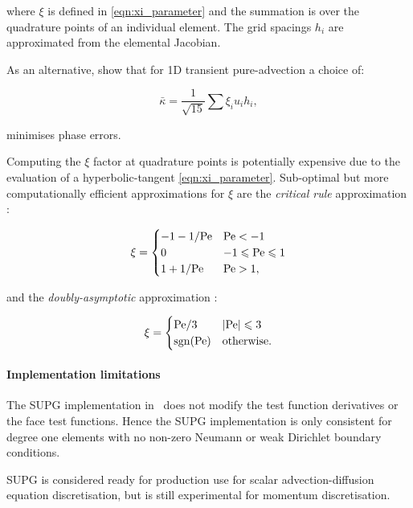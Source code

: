 where $\xi$ is defined in \eqref{eqn:xi_parameter} and the summation is over the quadrature points of an individual element. The
grid spacings $h_i$ are approximated from the elemental Jacobian.

As an alternative, \citet{raymond1976} show that for
1D transient pure-advection a choice of:

\begin{equation}\label{eqn:md_nu_bar_transient}
  \bar{\kappa} = \frac{1}{\sqrt{15}} \sum{\xi_i u_i h_i},
\end{equation}

minimises phase errors.

Computing the $\xi$ factor at quadrature points is potentially expensive due to
the evaluation of a hyperbolic-tangent \eqref{eqn:xi_parameter}. Sub-optimal but more computationally
efficient approximations for $\xi$ are the \emph{critical rule} approximation \citep{brooks1982}:

\begin{equation}
  \xi = \begin{cases}
          -1 - 1 / \mathrm{Pe}  & \mathrm{Pe} < -1 \\
          0             & -1 \leqslant \mathrm{Pe} \leqslant 1 \\
          1 + 1 / \mathrm{Pe}   & \mathrm{Pe} > 1,
        \end{cases}
\end{equation}

and the \emph{doubly-asymptotic} approximation \citep{DoneaBook}:

\begin{equation}
  \xi = \begin{cases}
          \mathrm{Pe} / 3  & \left| \mathrm{Pe} \right| \leqslant 3 \\
          \operatorname{sgn}(\mathrm{Pe})  & \textrm{otherwise}.
        \end{cases}
\end{equation}

\paragraph{Implementation limitations}

The SUPG implementation in \fluidity\ does not modify the test function derivatives
or the face test functions. Hence the SUPG implementation is only consistent
for degree one elements with no non-zero Neumann or weak Dirichlet boundary
conditions.

SUPG is considered ready for production use for scalar advection-diffusion
equation discretisation, but is still experimental for momentum discretisation.


